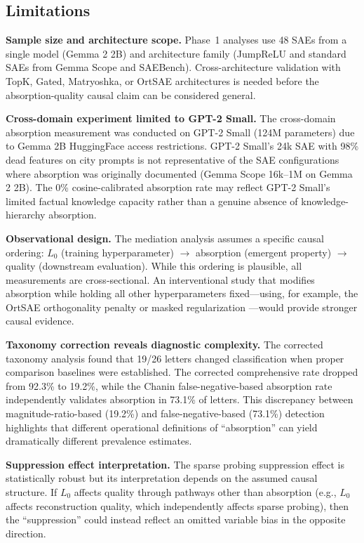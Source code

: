 \documentclass{article}
\begin{document}
\subsection{Limitations}
\label{sec:limitations}

\textbf{Sample size and architecture scope.}
Phase~1 analyses use 48 SAEs from a single model (Gemma 2 2B) and architecture family (JumpReLU and standard SAEs from Gemma Scope and SAEBench).
Cross-architecture validation with TopK, Gated, Matryoshka, or OrtSAE architectures is needed before the absorption-quality causal claim can be considered general.

\textbf{Cross-domain experiment limited to GPT-2 Small.}
The cross-domain absorption measurement was conducted on GPT-2 Small (124M parameters) due to Gemma 2B HuggingFace access restrictions.
GPT-2 Small's 24k SAE with 98\% dead features on city prompts is not representative of the SAE configurations where absorption was originally documented (Gemma Scope 16k--1M on Gemma 2 2B).
The 0\% cosine-calibrated absorption rate may reflect GPT-2 Small's limited factual knowledge capacity rather than a genuine absence of knowledge-hierarchy absorption.

\textbf{Observational design.}
The mediation analysis assumes a specific causal ordering: $L_0$ (training hyperparameter) $\to$ absorption (emergent property) $\to$ quality (downstream evaluation).
While this ordering is plausible, all measurements are cross-sectional.
An interventional study that modifies absorption while holding all other hyperparameters fixed---using, for example, the OrtSAE orthogonality penalty \citep{korznikov2025ortsae} or masked regularization \citep{narayanaswamy2026masked}---would provide stronger causal evidence.

\textbf{Taxonomy correction reveals diagnostic complexity.}
The corrected taxonomy analysis found that 19/26 letters changed classification when proper comparison baselines were established.
The corrected comprehensive rate dropped from 92.3\% to 19.2\%, while the Chanin false-negative-based absorption rate independently validates absorption in 73.1\% of letters.
This discrepancy between magnitude-ratio-based (19.2\%) and false-negative-based (73.1\%) detection highlights that different operational definitions of ``absorption'' can yield dramatically different prevalence estimates.

\textbf{Suppression effect interpretation.}
The sparse probing suppression effect is statistically robust but its interpretation depends on the assumed causal structure.
If $L_0$ affects quality through pathways other than absorption (e.g., $L_0$ affects reconstruction quality, which independently affects sparse probing), then the ``suppression'' could instead reflect an omitted variable bias in the opposite direction.
\end{document}
